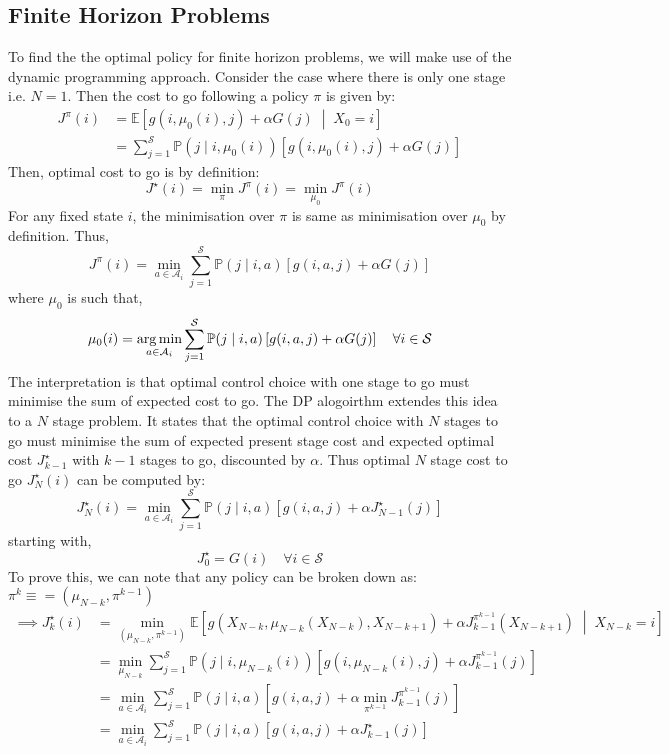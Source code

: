 \subsection{Finite Horizon Problems}
To find the the optimal policy for finite horizon problems, we will make use of the
dynamic programming approach. Consider the case where there is only one stage i.e. \(N=1\).
Then the cost to go following a policy \(\pi \) is given by:
\[
    \begin{aligned}
        J^{\pi} (i) &= \mathbb{E} \left[ g(i,\mu _0(i),j) + \alpha G(j) \;\middle|\; X_0 = i \right]\\
        &= \sum_{j = 1 }^{\mathcal{S} }  \mathbb{P} (j\mid i,\mu _0(i)) \left[ g(i,\mu _0(i),j) + \alpha G(j) \right]
    \end{aligned}
\]
Then, optimal cost to go is by definition:
\[
    J^{\star} (i) = \min_\pi  J^{\pi} (i) = \min_{\mu_0} J^{\pi}(i)
\]
For any fixed state \(i\), the minimisation over \(\pi \) is same as minimisation over \(\mu _0\) by
definition. Thus,
\[
    J^\pi (i) = \min\limits_{a \in \mathcal{A}_i} \sum_{j=1}^{\mathcal{S}} \mathbb{P} (
        j \mid  i,a) \left[ g(i,a,j) + \alpha G(j) \right]
\]
where \(\mu _0\) is such that,
\[
    \mu _0(i) = \operatorname*{arg\,min}_{a \in \mathcal{A}_i} \sum_{j=1}^{\mathcal{S}} \mathbb{P} (
        j \mid  i,a) \left[ g(i,a,j) + \alpha G(j) \right] \quad \forall i \in \mathcal{S}
\]
The interpretation is that optimal control choice with one stage to go must minimise the sum of
expected cost to go. The DP alogoirthm extendes this idea to a \(N\) stage problem. It states that
the optimal control choice with \(N\) stages to go must minimise the sum of expected
present stage cost and expected optimal cost \(J^{\star}_{k-1} \) with \(k-1\) stages to go, discounted
by \(\alpha\). Thus optimal \(N\) stage cost to go \(J^{\star}_N(i)\) can be computed by:
\[
    J^{\star}_N(i) = \min_{a \in \mathcal{A}_i} \sum_{j=1}^{\mathcal{S}} \mathbb{P} (
        j \mid  i,a) \left[ g(i,a,j) + \alpha J^{\star}_{N-1}(j) \right]
\]
starting with,
\[
    J^{\star}_0 = G(i) \quad \forall i \in \mathcal{S}
\]
To prove this, we can note that any policy can be broken down as: \(\pi ^k \equiv = (\mu_{N-k}, \pi^{k-1} )\)
\[
    \begin{aligned}
        \implies J^{\star} _k(i) &= \min\limits_{(\mu _{N-k}, \pi^{k-1})}
        \mathbb{E} \left[ g( X_{N-k}, \mu _{N-k}(X_{N-k}), X_{N-k+1}) + \alpha J^{\pi^{k-1} }_{k-1}
        (X_{N-k+1}) \;\middle|\; X_{N-k} = i \right] \\
        &= \min\limits_{\mu _{N-k}} \sum_{j=1}^{\mathcal{S}} \mathbb{P} (j\mid i,\mu _{N-k}(i)) \left[ 
            g(i,\mu _{N-k}(i),j) + \alpha J^{\pi^{k-1} }_{k-1}(j) \right]\\
        &= \min_{a \in \mathcal{A} _i} \sum_{j=1}^{\mathcal{S}} \mathbb{P} (j\mid i,a) \left[ 
            g(i,a,j) + \alpha \min _{\pi^{k-1}} J^{\pi^{k-1}}_{k-1}(j) \right]\\
        &= \min_{a \in \mathcal{A} _i} \sum_{j=1}^{\mathcal{S}} \mathbb{P} (j\mid i,a) \left[
            g(i,a,j) + \alpha J^{\star}_{k-1}(j) \right]
    \end{aligned}
\]

